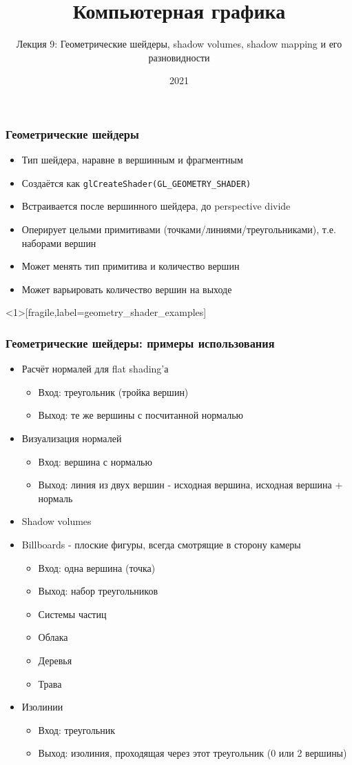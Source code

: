 \documentclass{beamer}
\title{Компьютерная графика}
\subtitle{Лекция 9: Геометрические шейдеры, shadow volumes, shadow mapping и его разновидности}
\date{2021}
\begin{document}
\frame{\titlepage}

\begin{frame}[fragile]
\frametitle{Геометрические шейдеры}
\begin{itemize}
\item Тип шейдера, наравне в вершинным и фрагментным
\pause
\item Создаётся как \verb|glCreateShader(GL_GEOMETRY_SHADER)|
\pause
\item Встраивается после вершинного шейдера, до perspective divide
\pause
\item Оперирует целыми примитивами (точками/линиями/треугольниками), т.е. наборами вершин
\pause
\item Может менять тип примитива и количество вершин
\pause
\item Может варьировать количество вершин на выходе
\end{itemize}
\end{frame}

\begin{frame}<1>[fragile,label=geometry_shader_examples]
\frametitle{Геометрические шейдеры: примеры использования}
\fontsize{10pt}{10pt}
\begin{itemize}
\item Расчёт нормалей для flat shading'а
\pause
\begin{itemize}
\item Вход: треугольник (тройка вершин)
\item Выход: те же вершины с посчитанной нормалью
\end{itemize}
\pause
\item Визуализация нормалей
\pause
\begin{itemize}
\item Вход: вершина с нормалью
\item Выход: линия из двух вершин - исходная вершина, исходная вершина + нормаль
\end{itemize}
\pause
\item Shadow volumes
\pause
\item Billboards - плоские фигуры, всегда смотрящие в сторону камеры
\pause
\begin{itemize}
\item Вход: одна вершина (точка)
\item Выход: набор треугольников
\pause
\item Системы частиц
\pause
\item Облака
\pause
\item Деревья
\pause
\item Трава
\end{itemize}
\pause
\item Изолинии
\pause
\begin{itemize}
\item Вход: треугольник
\item Выход: изолиния, проходящая через этот треугольник (0 или 2 вершины)
\end{itemize}
\end{itemize}
\end{frame}
\end{document}
